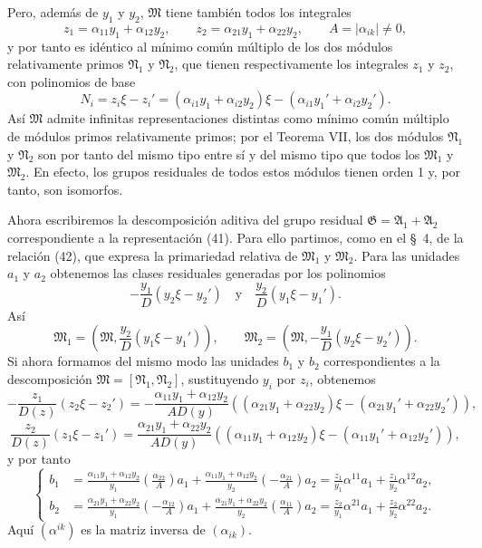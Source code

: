 Pero, además de $y_1$ y $y_2$, $\mathfrak M$ tiene también todos los integrales
\[
 z_1=\alpha_{11}y_1+\alpha_{12}y_2,
 \qquad
 z_2=\alpha_{21}y_1+\alpha_{22}y_2,
 \qquad
 A=|\alpha_{ik}|\ne0,
\]
y por tanto es idéntico al mínimo común múltiplo de los dos módulos relativamente primos $\mathfrak N_1$ y $\mathfrak N_2$, que tienen respectivamente los integrales $z_1$ y $z_2$, con polinomios de base
\[
 N_i=z_i\xi-z_i'=(\alpha_{i1}y_1+\alpha_{i2}y_2)\xi-(\alpha_{i1}y_1'+\alpha_{i2}y_2').
\]
Así $\mathfrak M$ admite infinitas representaciones distintas como mínimo común múltiplo de módulos primos relativamente primos; por el Teorema VII, los dos módulos $\mathfrak N_1$ y $\mathfrak N_2$ son por tanto del mismo tipo entre sí y del mismo tipo que todos los $\mathfrak M_1$ y $\mathfrak M_2$. En efecto, los grupos residuales de todos estos módulos tienen orden 1 y, por tanto, son isomorfos.

Ahora escribiremos la descomposición aditiva del grupo residual $\mathfrak G=\mathfrak A_1+\mathfrak A_2$ correspondiente a la representación (41). Para ello partimos, como en el \S~4, de la relación (42), que expresa la primariedad relativa de $\mathfrak M_1$ y $\mathfrak M_2$. Para las unidades $a_1$ y $a_2$ obtenemos las clases residuales generadas por los polinomios
\[
 -\frac{y_1}{D}(y_2\xi-y_2')
 \quad\text{y}\quad
 \frac{y_2}{D}(y_1\xi-y_1').
\]
Así
\[
 \mathfrak M_1=\left(\mathfrak M,\frac{y_2}{D}(y_1\xi-y_1')\right),
 \qquad
 \mathfrak M_2=\left(\mathfrak M,-\frac{y_1}{D}(y_2\xi-y_2')\right).
\]
Si ahora formamos del mismo modo las unidades $b_1$ y $b_2$ correspondientes a la descomposición $\mathfrak M=[\mathfrak N_1,\mathfrak N_2]$, sustituyendo $y_i$ por $z_i$, obtenemos
\[
 -\frac{z_1}{D(z)}(z_2\xi-z_2')
 =-\frac{\alpha_{11}y_1+\alpha_{12}y_2}{AD(y)}
 ((\alpha_{21}y_1+\alpha_{22}y_2)\xi-(\alpha_{21}y_1'+\alpha_{22}y_2')),
\]
\[
 \frac{z_2}{D(z)}(z_1\xi-z_1')
 =\frac{\alpha_{21}y_1+\alpha_{22}y_2}{AD(y)}
 ((\alpha_{11}y_1+\alpha_{12}y_2)\xi-(\alpha_{11}y_1'+\alpha_{12}y_2')),
\]
y por tanto
\begin{equation}
\left\{
\begin{aligned}
 b_1&=\frac{\alpha_{11}y_1+\alpha_{12}y_2}{y_1}
 \left(\frac{\alpha_{22}}{A}\right)a_1
 +\frac{\alpha_{11}y_1+\alpha_{12}y_2}{y_2}
 \left(-\frac{\alpha_{21}}{A}\right)a_2
 =\frac{z_1}{y_1}\alpha^{11}a_1+\frac{z_1}{y_2}\alpha^{12}a_2,\\
 b_2&=\frac{\alpha_{21}y_1+\alpha_{22}y_2}{y_1}
 \left(-\frac{\alpha_{12}}{A}\right)a_1
 +\frac{\alpha_{21}y_1+\alpha_{22}y_2}{y_2}
 \left(\frac{\alpha_{11}}{A}\right)a_2
 =\frac{z_2}{y_1}\alpha^{21}a_1+\frac{z_2}{y_2}\alpha^{22}a_2.
\end{aligned}\right.
\tag{43}
\end{equation}
Aquí $(\alpha^{ik})$ es la matriz inversa de $(\alpha_{ik})$.


